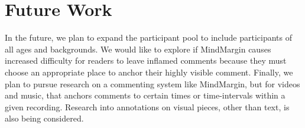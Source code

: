 \section{Future Work}
In the future, we plan to expand the participant pool to include participants of all ages and backgrounds. We would like to explore if MindMargin causes increased difficulty for readers to leave inflamed comments because they must choose an appropriate place to anchor their highly visible comment. Finally, we plan to pursue research on a commenting system like MindMargin, but for videos and music, that anchors comments to certain times or time-intervals within a given recording. Research into annotations on visual pieces, other than text, is also being considered.
